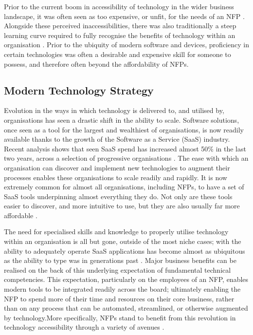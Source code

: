 Prior to the current boom in accessibility of technology in the wider business landscape, it was often seen as too expensive, or unfit, for the needs of an NFP \cite{infoxchange_2019} \cite{corder2001acquiring} \cite{le2008view}. Alongside these perceived inaccessibilities, there was also traditionally a steep learning curve required to fully recognise the benefits of technology within an organisation \cite{mcwilliams1996time} \cite{lai2017literature}. Prior to the ubiquity of modern software and devices, proficiency in certain technologies was often a desirable and expensive skill for someone to possess, and therefore often beyond the affordability of NFPs.

\subsection{Modern Technology Strategy}

Evolution in the ways in which technology is delivered to, and utilised by, organisations has seen a drastic shift in the ability to scale. Software solutions, once seen as a tool for the largest and wealthiest of organisations, is now readily available thanks to the growth of the Software as a Service (SaaS) industry. Recent analysis shows that seen SaaS spend has increased almost 50\% in the last two years, across a selection of progressive organisations \cite{blissfully2020}. The ease with which an organisation can discover and implement new technologies to augment their processes enables these organisations to scale readily and rapidly. It is now extremely common for almost all organisations, including NFPs, to have a set of SaaS tools underpinning almost everything they do. Not only are these tools easier to discover, and more intuitive to use, but they are also usually far more affordable \cite{ma2008pricing}.

The need for specialised skills and knowledge to properly utilise technology within an organisation is all but gone, outside of the most niche cases; with the ability to adequately operate SaaS applications has become almost as ubiquitous as the ability to type was in generations past \cite{garrido2010understanding} \cite{fischer2005computational} \cite{jackson2010international}. Major business benefits can be realised on the back of this underlying expectation of fundamental technical competencies. This expectation, particularly on the employees of an NFP, enables modern tools to be integrated readily across the board; ultimately enabling the NFP to spend more of their time and resources on their core business, rather than on any process that can be automated, streamlined, or otherwise augmented by technology.More specifically, NFPs stand to benefit from this revolution in technology accessibility through a variety of avenues \cite{kobelsky2014impact}.

